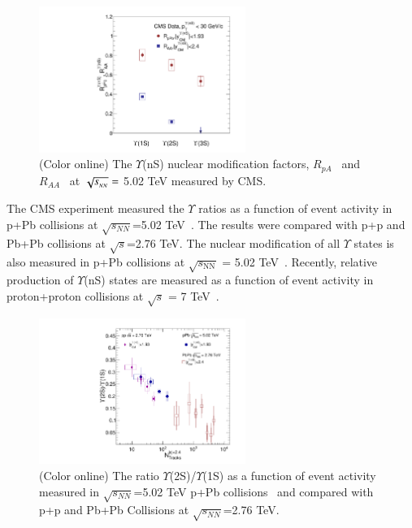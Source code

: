 \begin{figure}
\centering
  \includegraphics[width=0.60\textwidth]{Figures/Fig13_LHC_YnSRPPbRAAInt.pdf}
  \caption{(Color online) The $\Upsilon$(nS) nuclear modification factors,
    $R_{pA}$~\cite{CMS:2022wfi} and $R_{AA}$~\cite{CMS:2018zza}
    at $\sqrt{s_{_{NN}}} =$ 5.02 TeV measured by CMS.
  }
 \label{fig:LHCpBPbPb}
\end{figure}


The CMS experiment measured the $\Upsilon$ ratios as a function of event activity  
in p+Pb collisions at $\sqrt{s_{NN}}$=5.02 TeV~\cite{CMS:2013jsu}.
The results were compared with p+p and Pb+Pb collisions at $\sqrt{s}$=2.76 TeV.
 The nuclear modification of all $\Upsilon$ states is also measured in p+Pb collisions
 at $\sqrt{s_\mathrm{NN}}$ = 5.02 TeV~\cite{CMS:2022wfi}.
 Recently, relative production of $\Upsilon$(nS) states are measured as a function of
 event activity in proton+proton collisions at $ \sqrt{s} $ = 7 TeV~\cite{CMS:2020fae}.

\begin{figure}
  \begin{center}
    \includegraphics[width=0.60\textwidth]{Figures/Fig14_LHC_Y2SByY1S_NTrk.pdf}
\caption{(Color online)
   The ratio $\Upsilon$(2S)/$\Upsilon$(1S) as a function of event activity measured in 
$\sqrt{s_{NN}}$=5.02 TeV p+Pb collisions~\cite{CMS:2013jsu} and compared with p+p
and Pb+Pb Collisions at $\sqrt{s_{NN}}$=2.76 TeV.
}
\label{fig:UpsilonpPbA}
\end{center}
\end{figure}


